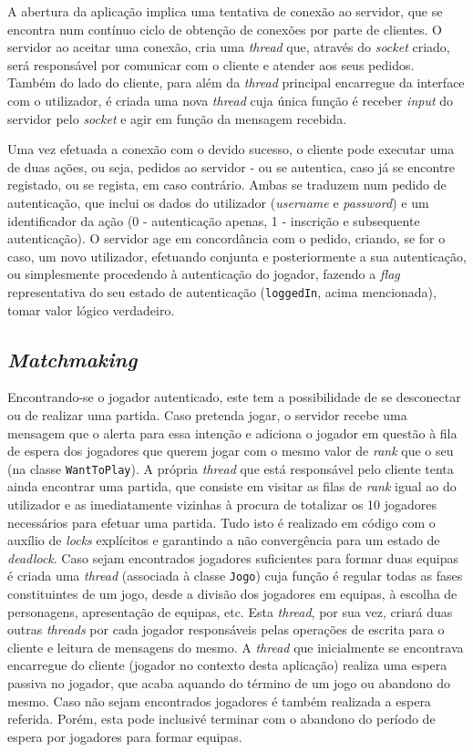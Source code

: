 \documentclass{llncs}
\begin{document}
A abertura da aplicação implica uma tentativa de conexão ao servidor,  
que se encontra num contínuo ciclo de obtenção de conexões por parte de 
clientes. O servidor ao aceitar uma conexão, cria uma \textit{thread} que, 
através do \textit{socket} criado, será responsável por comunicar com o cliente e 
atender aos seus pedidos. Também do lado do cliente, para além da \textit{thread} 
principal encarregue da interface com o utilizador, é criada uma nova 
\textit{thread} cuja única função é receber \textit{input} do servidor pelo \textit{socket} e 
agir em função da mensagem recebida.

Uma vez efetuada a conexão com o devido sucesso, o cliente pode executar uma de duas
ações, ou seja, pedidos ao servidor - ou se autentica, caso já se encontre registado, ou se regista, 
em caso contrário. Ambas se traduzem num pedido de autenticação, que 
inclui os dados do utilizador (\textit{username} e \textit{password}) e um 
identificador da ação (0 - autenticação apenas, 1 - inscrição e subsequente
autenticação). O servidor age em concordância com o pedido, criando, se for o caso, 
um novo utilizador, efetuando conjunta e posteriormente a sua autenticação, ou 
simplesmente procedendo à autenticação do jogador, fazendo a \textit{flag} 
representativa do seu estado de autenticação (\texttt{loggedIn}, acima mencionada), 
tomar valor lógico verdadeiro.


\subsection{\textit{Matchmaking}}

Encontrando-se o jogador autenticado, este tem a possibilidade de se 
desconectar ou de realizar uma partida. Caso pretenda jogar, o 
servidor recebe uma mensagem que o alerta para essa intenção e adiciona o 
jogador em questão à fila de espera dos jogadores que querem jogar com o mesmo 
valor de \textit{rank} que o seu (na classe \texttt{WantToPlay}). A própria \textit{thread} 
que está responsável pelo cliente tenta ainda encontrar uma partida, que 
consiste em visitar as filas de \textit{rank} igual ao do utilizador e 
as imediatamente vizinhas à procura de totalizar os 10 jogadores necessários 
para efetuar uma partida. Tudo isto é realizado em código com o auxílio de 
\textit{locks} explícitos e garantindo a não convergência para um estado 
de \textit{deadlock}. Caso sejam encontrados jogadores suficientes para 
formar duas equipas é criada uma \textit{thread} (associada à classe 
\texttt{Jogo}) cuja função é regular todas as fases constituintes de um 
jogo, desde a divisão dos jogadores em equipas, à escolha de personagens, 
apresentação de equipas, etc. Esta \textit{thread}, por sua vez, criará 
duas outras \textit{threads} por cada jogador responsáveis pelas operações de 
escrita para o cliente e leitura de mensagens do mesmo. A \textit{thread} 
que inicialmente se encontrava encarregue do cliente (jogador no contexto desta 
aplicação) realiza uma espera passiva no jogador, que acaba aquando do 
término de um jogo ou abandono do mesmo. Caso não sejam encontrados 
jogadores é também realizada a espera referida. Porém, esta pode inclusivé 
terminar com o abandono do período de espera por jogadores para formar equipas.
\end{document}
